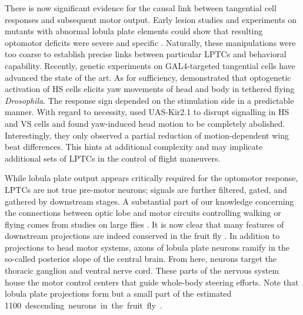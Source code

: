 There is now significant evidence for the causal link between tangential cell responses and subsequent motor output. Early lesion studies and experiments on mutants with abnormal lobula plate elements could show that resulting optomotor deficits were severe and specific \citep{Heisenberg:1978aa,Geiger:1981aa,Hausen:1983js}. Naturally, these manipulations were too coarse to establish precise links between particular LPTCs and behavioral capability. Recently, genetic experiments on GAL4-targeted tangential cells have advanced the state of the art. As for sufficiency, \citet{Haikala:2013cm} demonstrated that optogenetic activation of HS cells elicits yaw movements of head and body in tethered flying \textit{Drosophila}. The response sign depended on the stimulation side in a predictable manner. With regard to necessity, \citet{Kim:2017aa} used UAS-Kir2.1 to disrupt signalling in HS and VS cells and found yaw-induced head motion to be completely abolished. Interestingly, they only observed a partial reduction of motion-dependent wing beat differences. This hints at additional complexity and may implicate additional sets of LPTCs in the control of flight maneuvers.

While lobula plate output appears critically required for the optomotor response, LPTCs are not true pre-motor neurons; signals are further filtered, gated, and gathered by downstream stages. A substantial part of our knowledge concerning the connections between optic lobe and motor circuits controlling walking or flying comes from studies on large flies \citep{Strausfeld:1985aa,Strausfeld:1990aa,Haag:2007ir,Wertz:2008jt}. It is now clear that many features of downstream projections are indeed conserved in the fruit fly \citep[for instance, see][]{Suver:2016aa}. In addition to projections to head motor systems, axons of lobula plate neurons ramify in the so-called posterior slope of the central brain. From here, neurons target the thoracic ganglion and ventral nerve cord. These parts of the nervous system house the motor control centers that guide whole-body steering efforts. Note that lobula plate projections form but a small part of the estimated \SI{1100} descending neurons in the fruit fly \citep{Hsu:2016aa}.


